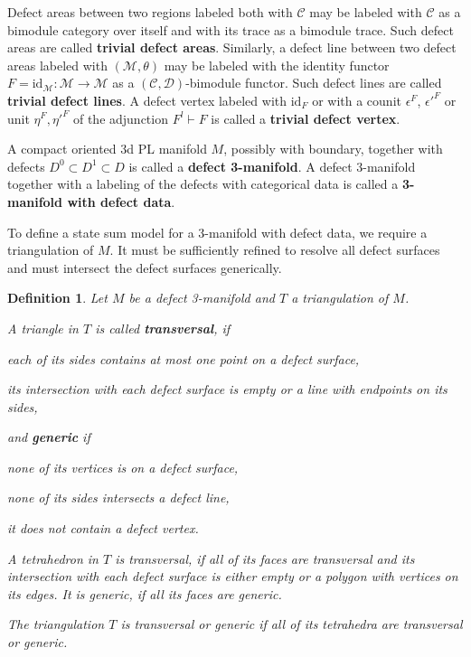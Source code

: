 \documentclass[1.5pt, a4paper]{article}
\newcommand{\mac}{\mathcal C}
\newcommand{\mad}{\mathcal D}
\newcommand{\mam}{\mathcal M}
\newcommand{\id}[0]{\mathrm{id}}
\newtheorem{definition}[theorem]{Definition}
\begin{document}
Defect areas between two regions labeled both with  $\mac$ may be labeled with  $\mac$ as a bimodule category over itself  and with its trace as a bimodule trace. Such defect areas are called {\bf trivial defect areas}. Similarly, a defect line between two defect areas labeled  with  $(\mam,\theta)$ may be labeled with the identity functor  $F=\id_\mam:\mam\to\mam$ as a $(\mac,\mad)$-bimodule functor. Such defect lines are called {\bf trivial defect lines}. A defect vertex labeled with  $\id_F$ or with a counit $\epsilon^F$, $\epsilon'^F$ or unit $\eta^F, \eta'^F$ of the adjunction $F^l\vdash F$ is called a {\bf trivial defect vertex}. 

A compact oriented 3d PL manifold $M$, possibly with boundary, together with  defects  $D^0\subset D^1\subset D$ is called a {\bf defect 3-manifold}. A defect 3-manifold together with a labeling of the defects with
categorical data is called a {\bf 3-manifold with defect data}.

To define a state sum model for a 3-manifold with defect data, we require a triangulation  of $M$. It must be sufficiently refined to resolve all defect surfaces and must intersect the defect surfaces generically.

\begin{definition} \label{def:gentrans} Let $M$ be a defect 3-manifold and $T$ a triangulation of $M$. 
\begin{compactenum}
\item A triangle in $T$ is called {\bf transversal}, if
\begin{compactitem}
\item each of its sides contains at most one point on a defect surface,
\item its intersection with each defect surface is empty or a line with endpoints on its sides,
\end{compactitem}

and {\bf generic} if
\begin{compactitem}
\item none of its vertices is on a defect surface,
\item none of its sides intersects a defect line, 
\item it does not contain a defect vertex.\\[-2ex]
\end{compactitem}
\item A tetrahedron in $T$ is transversal, if all  of its faces  are transversal and 
 its intersection with each defect surface is either empty or a polygon with vertices on its edges. It is  generic, if all  its faces are generic. \\[-2ex]

\item The  triangulation $T$ is transversal  or  generic if all of its tetrahedra are transversal or generic.
\end{compactenum}
\end{definition}
\end{document}
